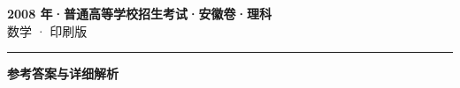 \documentclass[zihao=5, a4paper]{ctexart}
\begin{document}
\begin{center}
  {\Large\bfseries 2008 年·普通高等学校招生考试·安徽卷·理科}\\[4pt]
  {\large 数学 · 印刷版}
\end{center}
\medskip
{}

\par\bigskip\hrule\bigskip
{}
\begin{center}{\large\bfseries 参考答案与详细解析}\end{center}
\smallskip

\end{document}
